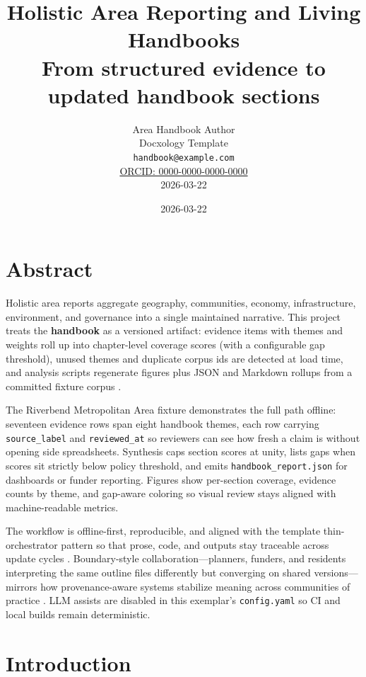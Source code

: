 \documentclass[
]{article}
\author{}
\date{}
\title{Holistic Area Reporting and Living Handbooks\\\normalsize From structured evidence to updated handbook sections}
\author{Area Handbook Author\\\footnotesize{Docxology Template}\\\footnotesize{\texttt{handbook@example.com}}\\\footnotesize{\href{https://orcid.org/0000-0000-0000-0000}{ORCID: 0000-0000-0000-0000}} \\ \footnotesize{2026-03-22}}
\date{2026-03-22}
\begin{document}
\maketitle
\thispagestyle{empty}
\tableofcontents
\newpage


\section{Abstract}\label{abstract}

Holistic area reports aggregate geography, communities, economy,
infrastructure, environment, and governance into a single maintained
narrative. This project treats the \textbf{handbook} as a versioned
artifact: evidence items with themes and weights roll up into
chapter-level coverage scores (with a configurable gap threshold),
unused themes and duplicate corpus ids are detected at load time, and
analysis scripts regenerate figures plus JSON and Markdown rollups from
a committed fixture corpus \citep{bowker2005, template2026}.

The Riverbend Metropolitan Area fixture demonstrates the full path
offline: seventeen evidence rows span eight handbook themes, each row
carrying \texttt{source\_label} and \texttt{reviewed\_at} so reviewers
can see how fresh a claim is without opening side spreadsheets.
Synthesis caps section scores at unity, lists gaps when scores sit
strictly below policy threshold, and emits
\texttt{handbook\_report.json} for dashboards or funder reporting.
Figures show per-section coverage, evidence counts by theme, and
gap-aware coloring so visual review stays aligned with machine-readable
metrics.

The workflow is offline-first, reproducible, and aligned with the
template thin-orchestrator pattern so that prose, code, and outputs stay
traceable across update cycles \citep{edwards2010}. Boundary-style
collaboration---planners, funders, and residents interpreting the same
outline files differently but converging on shared versions---mirrors
how provenance-aware systems stabilize meaning across communities of
practice \citep{gray2005, star1989}. LLM assists are disabled in this
exemplar's \texttt{config.yaml} so CI and local builds remain
deterministic.

\newpage

\section{Introduction}\label{introduction}
\end{document}
